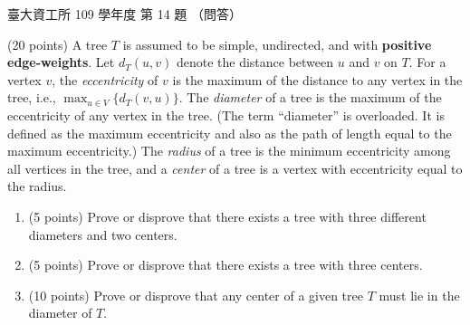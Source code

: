 \begin{pastexam}[label={px:ntu-109-dsaa-14}]{臺大資工所 109 學年度 第 14 題}
（問答）

(20 points) A tree $T$ is assumed to be simple, undirected, and with \textbf{positive
edge-weights}. Let $d_T(u,v)$ denote the distance between $u$ and $v$ on $T$. For a vertex $v$,
the \textit{eccentricity} of $v$ is the maximum of the distance to any vertex in the tree, i.e.,
$\max_{u\in V}\{d_T(v,u)\}$. The \textit{diameter} of a tree is the maximum of the eccentricity
of any vertex in the tree. (The term ``diameter'' is overloaded. It is defined as the maximum
eccentricity and also as the path of length equal to the maximum eccentricity.) The
\textit{radius} of a tree is the minimum eccentricity among all vertices in the tree, and a
\textit{center} of a tree is a vertex with eccentricity equal to the radius.
\begin{enumerate}[label=(\alph*)]
\item (5 points) Prove or disprove that there exists a tree with three different diameters and
two centers.
\item (5 points) Prove or disprove that there exists a tree with three centers.
\item (10 points) Prove or disprove that any center of a given tree $T$ must lie in the diameter
of $T$.
\end{enumerate}
\end{pastexam}

